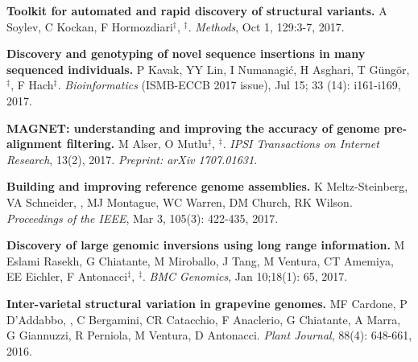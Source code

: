          \vspace{-.2cm}
         {\bf Toolkit for automated and rapid discovery of structural variants.}
          A Soylev, C Kockan, F Hormozdiari$^\ddag$, \calkan{}$^\ddag$.
          {\em Methods}, Oct 1, 129:3-7, 2017.
                                       


  \vspace{-.2cm}
                                     

         {\bf Discovery and genotyping of novel sequence insertions in many sequenced individuals.}
         P Kavak, YY Lin, I Numanagić, H Asghari, T Güngör, \calkan{}$^\ddag$, F Hach$^\ddag$.
         {\em Bioinformatics} (ISMB-ECCB 2017 issue), Jul 15; 33 (14): i161-i169, 2017.\\
         
  \vspace{-.2cm}
                                       
         {\bf MAGNET: understanding and improving the accuracy of genome pre-alignment filtering.}
         M Alser, O Mutlu$^\ddag$, \calkan{}$^\ddag$. 
         {\em IPSI Transactions on Internet Research}, 13(2), 2017. \textit{Preprint: arXiv 1707.01631.}



         
  \vspace{-.2cm}        
         {\bf Building and improving reference genome assemblies.} K Meltz-Steinberg, VA Schneider, \calkan{}, MJ Montague, WC Warren, DM Church, RK Wilson.
         {\em Proceedings of the IEEE}, Mar 3, 105(3): 422-435, 2017.


  \vspace{-.2cm}        
         {\bf Discovery of large genomic inversions using long
range information.} M Eslami Rasekh, G Chiatante, M Miroballo, J Tang, M Ventura, CT Amemiya, EE Eichler, F Antonacci$^\ddag$, \calkan{}$^\ddag$.
         {\em BMC Genomics}, Jan 10;18(1): 65, 2017.

  \vspace{-.2cm}        
  {\bf Inter-varietal structural variation in grapevine genomes.}
 MF Cardone, P D'Addabbo, \calkan{}, C Bergamini, CR Catacchio, F Anaclerio, G Chiatante, A Marra, G Giannuzzi, R Perniola, M Ventura, D Antonacci.
 {\em Plant Journal}, 88(4): 648-661, 2016.

